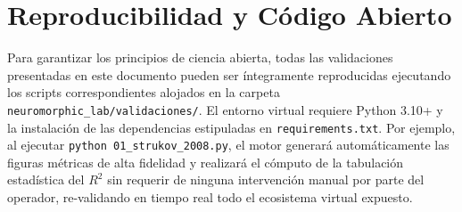 \section{Reproducibilidad y Código Abierto}
Para garantizar los principios de ciencia abierta, todas las validaciones presentadas en este documento pueden ser íntegramente reproducidas ejecutando los scripts correspondientes alojados en la carpeta \texttt{neuromorphic\_lab/validaciones/}. El entorno virtual requiere Python 3.10+ y la instalación de las dependencias estipuladas en \texttt{requirements.txt}. Por ejemplo, al ejecutar \texttt{python 01\_strukov\_2008.py}, el motor generará automáticamente las figuras métricas de alta fidelidad y realizará el cómputo de la tabulación estadística del $R^2$ sin requerir de ninguna intervención manual por parte del operador, re-validando en tiempo real todo el ecosistema virtual expuesto.
